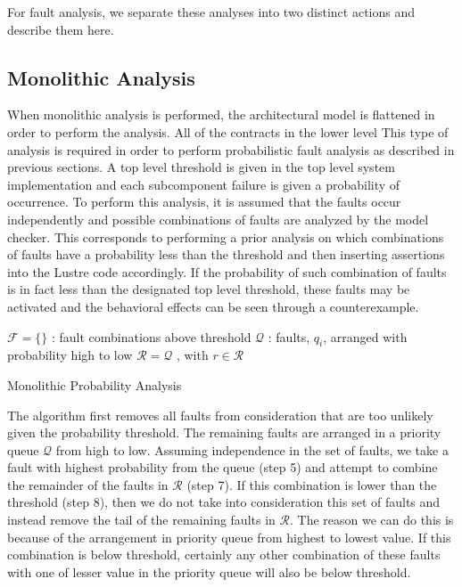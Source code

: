 For fault analysis, we separate these analyses into two distinct actions and describe them here.

\subsection{Monolithic Analysis}
When monolithic analysis is performed, the architectural model is flattened in order to perform the analysis. All of the contracts in the lower level  This type of analysis is required in order to perform probabilistic fault analysis as described in previous sections. A top level threshold is given in the top level system implementation and each subcomponent failure is given a probability of occurrence. To perform this analysis, it is assumed that the faults occur independently and possible combinations of faults are analyzed by the model checker. This corresponds to performing a prior analysis on which combinations of faults have a probability less than the threshold and then inserting assertions into the Lustre code accordingly. If the probability of such combination of faults is in fact less than the designated top level threshold, these faults may be activated and the behavioral effects can be seen through a counterexample.  

\begin{algorithm}[H]
 $\mathcal{F} = \{\}$ : fault combinations above threshold \;
 $\mathcal{Q}$ : faults, $q_i$, arranged with probability high to low \;
 $\mathcal{R} = \mathcal{Q}$ , with $r \in \mathcal{R}$\;
 \caption{Monolithic Probability Analysis}
\end{algorithm}

The algorithm first removes all faults from consideration that are too unlikely given the probability threshold. The remaining faults are arranged in a priority queue $\mathcal{Q}$ from high to low. Assuming independence in the set of faults, we take a fault with highest probability from the queue (step 5) and attempt to combine the remainder of the faults in $\mathcal{R}$ (step 7). If this combination is lower than the threshold (step 8), then we do not take into consideration this set of faults and instead remove the tail of the remaining faults in $\mathcal{R}$. The reason we can do this is because of the arrangement in priority queue from highest to lowest value. If this combination is below threshold, certainly any other combination of these faults with one of lesser value in the priority queue will also be below threshold. 


